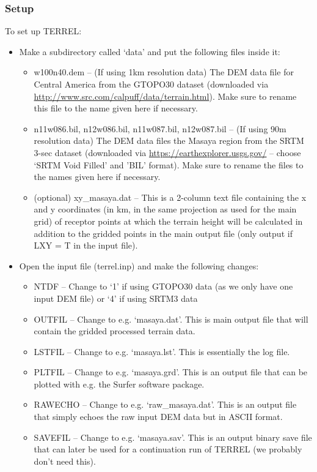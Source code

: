\documentclass[10pt,a4paper]{article}
\begin{document}
\subsubsection{Setup}
To set up TERREL:
\begin{itemize}
\item Make a subdirectory called `data' and put the following files inside it:
\begin{itemize}
\item w100n40.dem -- (If using 1km resolution data) The DEM data file for Central America from the GTOPO30 dataset (downloaded via \url{http://www.src.com/calpuff/data/terrain.html}). Make sure to rename this file to the name given here if necessary.
\item n11w086.bil, n12w086.bil, n11w087.bil, n12w087.bil -- (If using 90m resolution data)  The DEM data files the Masaya region from the SRTM 3-sec dataset (downloaded via \url{https://earthexplorer.usgs.gov/} -- choose `SRTM Void Filled' and 'BIL' format). Make sure to rename the files to the names given here if necessary.
\item (optional) xy\_masaya.dat -- This is a 2-column text file containing the x and y coordinates (in km, in the same projection as used for the main grid) of receptor points at which the terrain height will be calculated in addition to the gridded points in the main output file (only output if LXY = T in the input file).
\end{itemize}
\item Open the input file (terrel.inp) and make the following changes:
\begin{itemize}
\item NTDF -- Change to `1' if using GTOPO30 data (as we only have one input DEM file) or `4' if using SRTM3 data
\item OUTFIL -- Change to e.g. `masaya.dat'. This is main output file that will contain the gridded processed terrain data.
\item LSTFIL -- Change to e.g. `masaya.lst'. This is essentially the log file.
\item PLTFIL -- Change to e.g. `masaya.grd'. This is an output file that can be plotted with e.g. the Surfer software package.
\item RAWECHO -- Change to e.g. `raw\_masaya.dat'. This is an output file that simply echoes the raw input DEM data but in ASCII format.
\item SAVEFIL -- Change to e.g. `masaya.sav'. This is an output binary save file that can later be used for a continuation run of TERREL (we probably don't need this).

\end{itemize}
\end{itemize}
\end{document}
